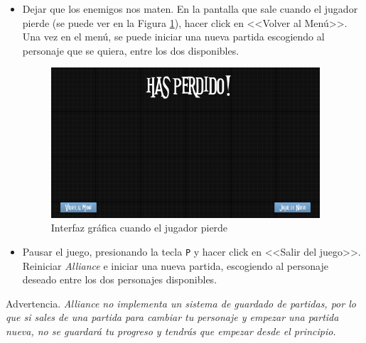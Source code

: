\begin{itemize}
\item Dejar que los enemigos nos maten. En la pantalla que sale cuando el jugador pierde (se puede ver en la Figura \ref{YouLose}), hacer click en <<Volver al Menú>>. Una vez en el menú, se puede iniciar una nueva partida escogiendo al personaje que se quiera, entre los dos disponibles.

\begin{figure}[H]
  \centering
  \includegraphics[width=10cm]{./images/YouLose.png}
  \caption{Interfaz gráfica cuando el jugador pierde}
  \label{YouLose}
\end{figure}

\item Pausar el juego, presionando la tecla \texttt{P} y hacer click en <<Salir del juego>>. Reiniciar \textit{Alliance} e iniciar una nueva partida, escogiendo al personaje deseado entre los dos personajes disponibles.
\end{itemize}

\renewcommand\bcStyleTitre[1]{\large\hspace*{1.8in}\textcolor{red!100}{#1}}
\begin{bclogo}[
  couleur=red!15,
  arrondi=0.25,
  logo=\hspace*{1in}\bctakecare,
  barre=none,
  noborder=true]{\hspace*{0.15in} Advertencia.}
\itshape \vspace*{0.15in}
\textit{Alliance} no implementa un sistema de guardado de partidas, por lo que si sales de una partida para cambiar tu personaje y empezar una partida nueva, no se guardará tu progreso y tendrás que empezar desde el principio.
\end{bclogo}



